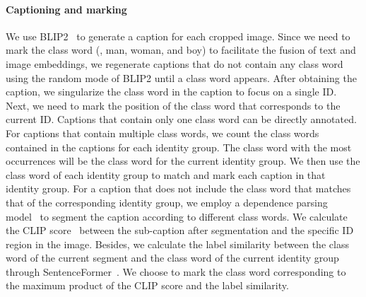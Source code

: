 \paragraph{Captioning and marking}
We use BLIP2~\cite{li2023blip} to generate a caption for each cropped image.
Since we need to mark the class word (\eg,  man, woman, and boy) to facilitate the fusion of text and image embeddings, we regenerate captions that do not contain any class word using the random mode of BLIP2 until a class word appears.
After obtaining the caption, we singularize the class word in the caption to focus on a single ID. 
Next, we need to mark the position of the class word that corresponds to the current ID. 
Captions that contain only one class word can be directly annotated. 
For captions that contain multiple class words, we count the class words contained in the captions for each identity group. 
The class word with the most occurrences will be the class word for the current identity group.
We then use the class word of each identity group to match and mark each caption in that identity group.
For a caption that does not include the class word that matches that of the corresponding identity group, we employ a dependence parsing model~\cite{montani20212} to segment the caption according to different class words. 
We calculate the CLIP score~\cite{radford2021learning} between the sub-caption after segmentation and the specific ID region in the image.
Besides, we calculate the label similarity between the class word of the current segment and the class word of the current identity group through SentenceFormer~\cite{reimers2019sentence}. 
We choose to mark the class word corresponding to the maximum product of the CLIP score and the label similarity.
